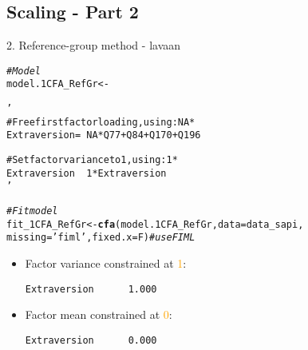 \documentclass[10pt]{beamer}\usepackage[]{graphicx}\usepackage[]{xcolor}
\makeatletter
\newcommand{\hlsng}[1]{\textcolor[rgb]{0.192,0.494,0.8}{#1}}%
\newcommand{\hlcom}[1]{\textcolor[rgb]{0.678,0.584,0.686}{\textit{#1}}}%
\newcommand{\hldef}[1]{\textcolor[rgb]{0.345,0.345,0.345}{#1}}%
\newcommand{\hlkwb}[1]{\textcolor[rgb]{0.69,0.353,0.396}{#1}}%
\newcommand{\hlkwc}[1]{\textcolor[rgb]{0.333,0.667,0.333}{#1}}%
\newcommand{\hlkwd}[1]{\textcolor[rgb]{0.737,0.353,0.396}{\textbf{#1}}}%
\newenvironment{kframe}{%
 \def\at@end@of@kframe{}%
 \ifinner\ifhmode%
  \def\at@end@of@kframe{\end{minipage}}%
  \begin{minipage}{\columnwidth}%
 \fi\fi%
 \def\FrameCommand##1{\hskip\@totalleftmargin \hskip-\fboxsep
 \colorbox{shadecolor}{##1}\hskip-\fboxsep
     \hskip-\linewidth \hskip-\@totalleftmargin \hskip\columnwidth}%
 \MakeFramed {\advance\hsize-\width
   \@totalleftmargin\z@ \linewidth\hsize
   \@setminipage}}%
 {\par\unskip\endMakeFramed%
 \at@end@of@kframe}
\newenvironment{knitrout}{}{} %
\makeatother
\begin{document}
\subsection*{Scaling - Part 2}
%
\begin{frame}[fragile]{2. Reference-group method - lavaan}

\begin{knitrout}
\color{fgcolor}\begin{kframe}
\begin{alltt}
\hlcom{# Model}
\hldef{model.1CFA_RefGr} \hlkwb{<-} \hlsng{'
  # Free first factor loading, using: NA*
  Extraversion =~ NA*Q77 + Q84 + Q170 + Q196
  
  # Set factor variance to 1, using: 1*
  Extraversion ~~ 1*Extraversion
 '}

\hlcom{# Fit model}
\hldef{fit_1CFA_RefGr} \hlkwb{<-} \hlkwd{cfa}\hldef{(model.1CFA_RefGr,} \hlkwc{data}\hldef{=data_sapi,}
                \hlkwc{missing}\hldef{=}\hlsng{'fiml'}\hldef{,} \hlkwc{fixed.x}\hldef{=F)}  \hlcom{# use FIML}
\end{alltt}
\end{kframe}
\end{knitrout}

\begin{itemize}
    \item Factor variance constrained at \textcolor{orange}{1}:\\
\begin{verbatim}
Extraversion      1.000
\end{verbatim}
    \item Factor mean constrained at \textcolor{orange}{0}:\\
\begin{verbatim}
Extraversion      0.000
\end{verbatim}
\end{itemize} 

\end{frame}
%
\end{document}
